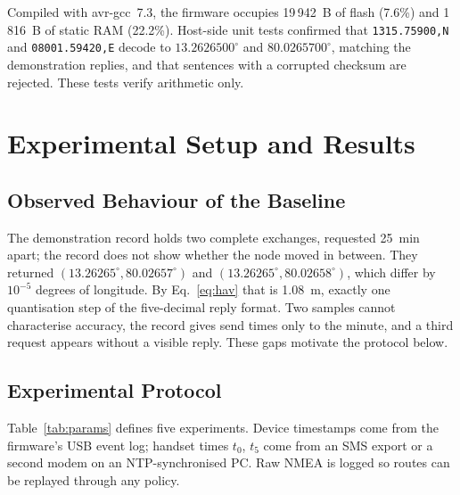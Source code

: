 \documentclass[conference]{IEEEtran}
\begin{document}
Compiled with avr-gcc~7.3, the firmware occupies 19\,942~B of flash (7.6\%) and 1\,816~B of static RAM (22.2\%). Host-side unit tests confirmed that \texttt{1315.75900,N} and \texttt{08001.59420,E} decode to $13.2626500^\circ$ and $80.0265700^\circ$, matching the demonstration replies, and that sentences with a corrupted checksum are rejected. These tests verify arithmetic only.

\section{Experimental Setup and Results}\label{sec:exp}

\subsection{Observed Behaviour of the Baseline}
The demonstration record holds two complete exchanges, requested 25~min apart; the record does not show whether the node moved in between. They returned $(13.26265^\circ, 80.02657^\circ)$ and $(13.26265^\circ, 80.02658^\circ)$, which differ by $10^{-5}$ degrees of longitude. By Eq.~\eqref{eq:hav} that is 1.08~m, exactly one quantisation step of the five-decimal reply format. Two samples cannot characterise accuracy, the record gives send times only to the minute, and a third request appears without a visible reply. These gaps motivate the protocol below.

\subsection{Experimental Protocol}
Table~\ref{tab:params} defines five experiments. Device timestamps come from the firmware's USB event log; handset times $t_0$, $t_5$ come from an SMS export or a second modem on an NTP-synchronised PC. Raw NMEA is logged so routes can be replayed through any policy.
\end{document}
